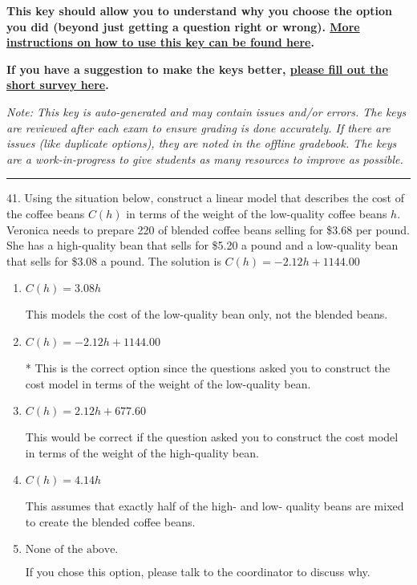 \documentclass{extbook}[14pt]
\begin{document}
\textbf{This key should allow you to understand why you choose the option you did (beyond just getting a question right or wrong). \href{https://xronos.clas.ufl.edu/mac1105spring2020/courseDescriptionAndMisc/Exams/LearningFromResults}{More instructions on how to use this key can be found here}.}

\textbf{If you have a suggestion to make the keys better, \href{https://forms.gle/CZkbZmPbC9XALEE88}{please fill out the short survey here}.}

\textit{Note: This key is auto-generated and may contain issues and/or errors. The keys are reviewed after each exam to ensure grading is done accurately. If there are issues (like duplicate options), they are noted in the offline gradebook. The keys are a work-in-progress to give students as many resources to improve as possible.}

\rule{\textwidth}{0.4pt}

41. Using the situation below, construct a linear model that describes the cost of the coffee beans $C(h)$ in terms of the weight of the low-quality coffee beans $h$.
Veronica needs to prepare 220 of blended coffee beans selling for \$3.68 per pound. She has a high-quality bean that sells for \$5.20 a pound and a low-quality bean that sells for \$3.08 a pound. 
The solution is $ C(h) = -2.12 h + 1144.00 $ 

\begin{enumerate}[label=\Alph*.] 
\item $ C(h) = 3.08 h $ 

 This models the cost of the low-quality bean only, not the blended beans. 
\item $ C(h) = -2.12 h + 1144.00 $ 

 * This is the correct option since the questions asked you to construct the cost model in terms of the weight of the low-quality bean. 
\item $ C(h) = 2.12 h + 677.60 $ 

 This would be correct if the question asked you to construct the cost model in terms of the weight of the high-quality bean. 
\item $ C(h) = 4.14 h $ 

 This assumes that exactly half of the high- and low- quality beans are mixed to create the blended coffee beans. 
\item $ \text{None of the above.} $ 

 If you chose this option, please talk to the coordinator to discuss why. 
\end{enumerate} 
 
\end{document}
